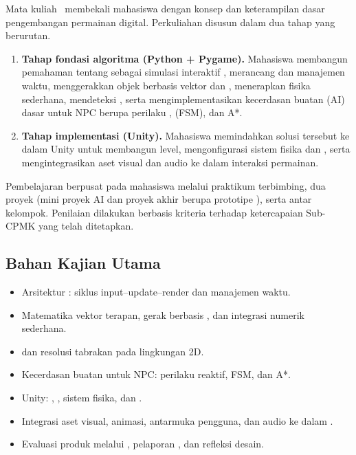 Mata kuliah \NamaMK\ membekali mahasiswa dengan konsep dan keterampilan dasar
pengembangan permainan digital. Perkuliahan disusun dalam dua tahap yang
berurutan.

\begin{enumerate}
  \item \textbf{Tahap fondasi algoritma (Python + Pygame).}
        Mahasiswa membangun pemahaman tentang  sebagai simulasi
        interaktif , merancang  dan
        manajemen waktu, menggerakkan objek berbasis vektor dan
        , menerapkan fisika sederhana, mendeteksi
        , serta mengimplementasikan kecerdasan buatan (AI)
        dasar untuk NPC berupa perilaku ,  (FSM), dan  A*.
  \item \textbf{Tahap implementasi  (Unity).}
        Mahasiswa memindahkan solusi  tersebut ke dalam
        Unity untuk membangun level, mengonfigurasi sistem fisika dan
        , serta mengintegrasikan aset visual dan audio ke
        dalam interaksi permainan.
\end{enumerate}

Pembelajaran berpusat pada mahasiswa melalui praktikum terbimbing, dua proyek
(mini proyek AI dan proyek akhir berupa prototipe ), serta
 antar kelompok. Penilaian dilakukan berbasis kriteria
terhadap ketercapaian Sub-CPMK yang telah ditetapkan.

\subsection*{Bahan Kajian Utama}

\begin{itemize}
  \item Arsitektur : siklus input--update--render dan manajemen waktu.
  \item Matematika vektor terapan, gerak berbasis , dan integrasi numerik sederhana.
  \item {} dan resolusi tabrakan pada lingkungan 2D.
  \item Kecerdasan buatan untuk NPC: perilaku reaktif, FSM, dan  A*.
  \item {} Unity: , , sistem fisika, dan .
  \item Integrasi aset visual, animasi, antarmuka pengguna, dan audio ke dalam .
  \item Evaluasi produk melalui , pelaporan , dan refleksi desain.
\end{itemize}

